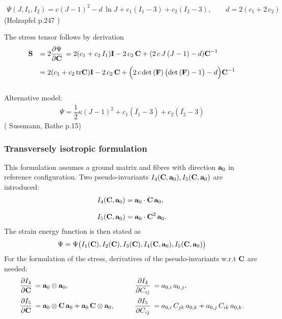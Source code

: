 \begin{equation*}
  \begin{array}{lll}
    \Psi(J,I_1,I_2) = c(J-1)^2 - d\,\ln J + c_1(I_1 - 3) + c_2(I_2 - 3), \qquad d = 2(c_1 + 2\,c_2)
  \end{array}
\end{equation*}
(Holzapfel p.247 \cite{holzapfel2000nonlinear})

The stress tensor follows by derivation
\begin{equation*}
  \begin{array}{lll}
    \bfS &= 2\p{\Psi}{\bfC} = 2(c_1 + c_2\,I_1)\bfI - 2\,c_2\,\bfC + (2\,c\,J\,(J-1)-d)\bfC^{-1}\\[4mm]
    &= 2(c_1 + c_2\,\tr{\bfC})\bfI - 2\,c_2\,\bfC + \Big(2\,c\,\det(\bfF)\,\big(\det(\bfF)-1\big)-d\Big)\bfC^{-1}\\[4mm]
  \end{array}
\end{equation*}

Alternative model:
\begin{equation*}
  \begin{array}{lll}
    \Psi = \dfrac12 \kappa (J - 1)^2 + c_1(\bar{I_1} - 3) + c_2(\bar{I_2} - 3)
  \end{array}
\end{equation*}
(\cite{SUSSMAN1987357} Sussmann, Bathe p.15)

\subsubsection{Transversely isotropic formulation}

This formulation assumes a ground matrix and fibres with direction $\textbf{a}_0$ in reference configuration. Two pseudo-invariants $I_4(\textbf{C}, \textbf{a}_0), I_5(\textbf{C}, \textbf{a}_0)$ are introduced:
\begin{equation*}
  \begin{array}{lll}
    I_4(\textbf{C}, \textbf{a}_0) = \textbf{a}_0\cdot \textbf{C}\,\textbf{a}_0,\\[4mm]
    I_5(\textbf{C}, \textbf{a}_0) = \textbf{a}_0\cdot\textbf{C}^2\,\textbf{a}_0.
  \end{array}
\end{equation*}
The strain energy function is then stated as
\begin{equation*}
  \begin{array}{lll}
    \Psi = \Psi\big(I_1(\textbf{C}), I_2(\textbf{C}), I_3(\textbf{C}), I_4(\textbf{C}, \textbf{a}_0), I_5(\textbf{C}, \textbf{a}_0)\big)
  \end{array}
\end{equation*}
For the formulation of the stress, derivatives of the pseudo-invariants w.r.t $\textbf{C}$ are needed:
\begin{equation*}
  \begin{array}{lll}
    \p{I_4}{\bfC} = \bfa_0 \otimes \bfa_0, \qquad & \p{I_4}{C_{ij}} = a_{0,i}\,a_{0,j},\\[4mm]
    \p{I_5}{\bfC} = \bfa_0 \otimes \bfC\,\bfa_0 + \bfa_0\,\bfC \dyad \bfa_0, \qquad &\p{I_5}{C_{ij}} = a_{0,i}\,C_{jk}\,a_{0,k} + a_{0,j}\,C_{ik}\,a_{0,k}.
  \end{array}
\end{equation*}

